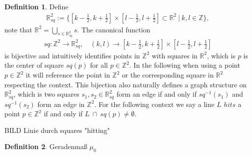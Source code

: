 \documentclass[12pt,a4paper]{scrartcl}
\numberwithin{equation}{section}
\numberwithin{equation}{section}
\theoremstyle{definition}
\newtheorem{definition}{Definition}
\begin{document}
\begin{definition}
	Define 
	\begin{align}
		\mathbb{R}^2_{sq} := \{[k - \frac{1}{2}, k + \frac{1}{2}] \times [l- \frac{1}{2}, l + \frac{1}{2}] \subset \mathbb{R}^2\ |\ k,l \in \mathbb{Z}\}, 
	\end{align} 
	note that $\mathbb{R}^2 = \bigcup_{s\in \mathbb{R}^2_{sq}} s$. The canonical function
	\begin{align}
	sq: \mathbb{Z}^2 \to \mathbb{R}^2_{sq},\quad (k,l)\to [k - \frac{1}{2}, k + \frac{1}{2}] \times [l- \frac{1}{2}, l + \frac{1}{2}]
	\end{align}
	is bijective and intuitively identifies points in $\mathbb{Z}^2$ with squares in $\mathbb{R}^2$, which is $p$ is the center of square $sq(p)$ for all $p\in \mathbb{Z}^2$. In the following when using a point $p\in \mathbb{Z}^2$ it will reference the point in $\mathbb{Z}^2$ or the corresponding square in $\mathbb{R}^2$ respecting the context. This bijection also naturally defines a graph structure on $\mathbb{R}^2_{sq}$, which is two squares $s_1, s_2\in \mathbb{R}^2_{sq}$ form an edge if and only if $sq^{-1}(s_1)$ and $sq^{-1}(s_2)$ form an edge in $\mathbb{Z}^2$. 
	\noindent For the following context we say a line $L$ $hits$ a point $p\in \mathbb{Z}^2$ if and only if $L\ \cap\ sq(p) \neq \emptyset$.
	
\end{definition}

BILD Linie durch squares "hitting"\\


\begin{definition}
	Geradenmaß $\mu_0$
\end{definition}
\end{document}
